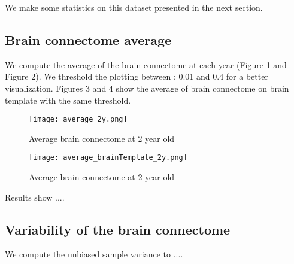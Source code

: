 \documentclass[]{spie}  %
\begin{document}
We make some statistics on this dataset presented in the next section.

\subsection{Brain connectome average}

We compute the average of the brain connectome at each year (Figure 1 and Figure 2). We threshold the plotting between : 0.01 and 0.4 for a better visualization.
Figures 3 and 4 show the average of brain connectome on brain template with the same threshold.



\begin{figure}
\centering 
\texttt{[image: average\_2y.png]}
\caption[Average brain connectome at 2 year old]{Average brain connectome at 2 year old}
\label{fig:AverageBrainConnectome2YearOld}
\end{figure} 


\begin{figure}
\centering 
\texttt{[image: average\_brainTemplate\_2y.png]}
\caption[Average brain connectome at 2 year old]{Average brain connectome at 2 year old}
\label{fig:AverageBrainConnectome2YearOld}
\end{figure} 


Results show ....


\subsection{Variability of the brain connectome}

We compute the unbiased sample variance to ....


\end{document}
